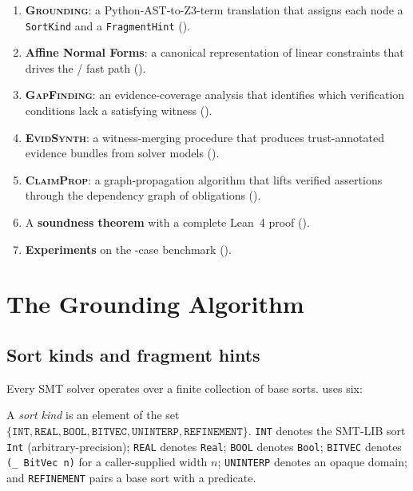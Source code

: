 \documentclass[11pt]{article}
\newcommand{\GroundAlg}{\textsc{Grounding}}  %
\newcommand{\GapAlg}{\textsc{GapFinding}}    %
\newcommand{\EvidAlg}{\textsc{EvidSynth}}    %
\newcommand{\PropAlg}{\textsc{ClaimProp}}    %
\begin{document}
\begin{enumerate}[label=(\roman*)]
  \item \textbf{\GroundAlg{}}: a Python-AST-to-Z3-term translation
    that assigns each node a \texttt{SortKind} and a
    \texttt{FragmentHint} ().
  \item \textbf{Affine Normal Forms}: a canonical representation
    of linear constraints that drives the \QFLIA{}/\QFLRA{} fast
    path ().
  \item \textbf{\GapAlg{}}: an evidence-coverage analysis that
    identifies which verification conditions lack a satisfying
    witness ().
  \item \textbf{\EvidAlg{}}: a witness-merging procedure that
    produces trust-annotated evidence bundles from solver
    models ().
  \item \textbf{\PropAlg{}}: a graph-propagation algorithm that
    lifts verified assertions through the dependency graph of
    obligations ().
  \item A \textbf{soundness theorem} with a complete Lean~4 proof
    ().
  \item \textbf{Experiments} on the \numcases-case \JuGeo{}
    benchmark ().
\end{enumerate}

\section{The Grounding Algorithm}\label{sec:grounding}

\subsection{Sort kinds and fragment hints}

Every SMT solver operates over a finite collection of base sorts.
\JuGeo{} uses six:

\begin{definition}[SortKind]\label{def:sort-kind}
A \emph{sort kind} is an element of the set
$\{\mathtt{INT},\mathtt{REAL},\mathtt{BOOL},\mathtt{BITVEC},
   \mathtt{UNINTERP},\mathtt{REFINEMENT}\}$.
\texttt{INT} denotes the SMT-LIB sort \texttt{Int}
(arbitrary-precision); \texttt{REAL} denotes \texttt{Real};
\texttt{BOOL} denotes \texttt{Bool}; \texttt{BITVEC} denotes
\texttt{(\_ BitVec n)} for a caller-supplied width $n$;
\texttt{UNINTERP} denotes an opaque domain; and \texttt{REFINEMENT}
pairs a base sort with a predicate.
\end{definition}
\end{document}
